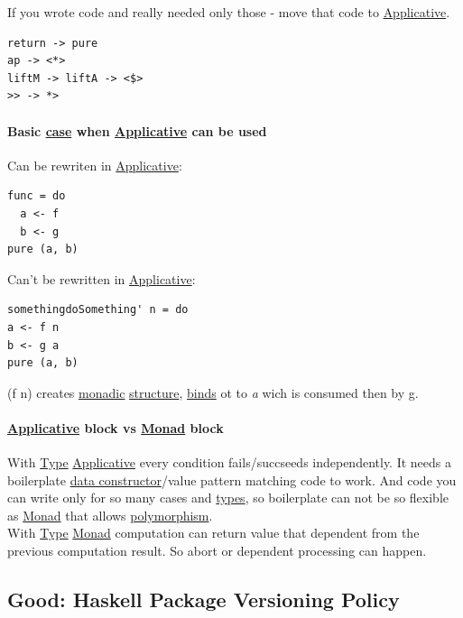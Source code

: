 \documentclass[11pt]{article}
\begin{document}
If you wrote code and really needed only those - move that code to \hyperref[org2dfdf4a]{Applicative}.\\
\begin{verbatim}
return -> pure
ap -> <*>
liftM -> liftA -> <$>
>> -> *>
\end{verbatim}

\paragraph{Basic \hyperref[org41d12b6]{case} when \hyperref[org2dfdf4a]{Applicative} can be used}
\label{sec:org1510a8a}

Can be rewriten in \hyperref[org2dfdf4a]{Applicative}:\\
\begin{verbatim}
func = do
  a <- f
  b <- g
pure (a, b)
\end{verbatim}

Can't be rewritten in \hyperref[org2dfdf4a]{Applicative}:\\
\begin{verbatim}
somethingdoSomething' n = do
a <- f n
b <- g a
pure (a, b)
\end{verbatim}
(f n) creates \hyperref[orgad51197]{monadic} \hyperref[org8051f61]{structure}, \hyperref[orgdb14c59]{binds} ot to \emph{a} wich is consumed then by g.\\

\paragraph{\hyperref[org2dfdf4a]{Applicative} block vs \hyperref[org86a5d95]{Monad} block}
\label{sec:org8f661e1}

With \hyperref[orgc4aea2f]{Type} \hyperref[org2dfdf4a]{Applicative} every condition fails/succseeds independently. It needs a boilerplate \hyperref[org1fbdcfd]{data constructor}/value pattern matching code to work. And code you can write only for so many cases and \hyperref[org4209edd]{types}, so boilerplate can not be so flexible as \hyperref[org86a5d95]{Monad} that allows \hyperref[org64df340]{polymorphism}.\\
With \hyperref[orgc4aea2f]{Type} \hyperref[org86a5d95]{Monad} computation can return value that dependent from the previous computation result. So abort or dependent processing can happen.\\

\subsection{\label{org9474414}Good: Haskell Package Versioning Policy}
\label{sec:org35eb292}
\end{document}

